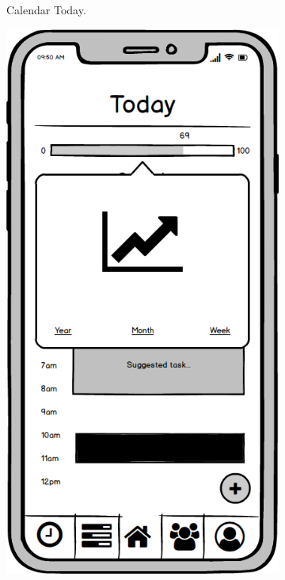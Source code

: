 \begin{figure}
\begin{subfigure}[b]{0.3\textwidth}
        \caption{Calendar Today.}
        \label{fig:calendar_today}
    \end{subfigure}
    \hfill
    \begin{subfigure}[b]{0.3\textwidth}
        \centering
        \includegraphics[width=\textwidth]{./graphics/design/Dashboard (Streak trend Calendar View).png}

\end{subfigure}
\end{figure}
